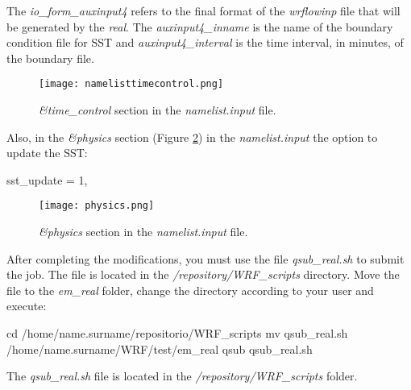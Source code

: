  The \textit{io\_form\_auxinput4} refers to the final format of the \textit{wrflowinp} file that will be generated by 
the \textit{real}. The \textit{auxinput4\_inname} is the name of the boundary condition file for SST and \textit{auxinput4\_interval} 
is the time interval, in minutes, of the boundary file.
\bigskip

\begin{figure}[H]
    \centering
    \texttt{[image: namelisttimecontrol.png]}
    \caption{\textit{\&time\_control} section in the \textit{namelist.input} file.}
    \label{timecontrolnamelist}
\end{figure}
\bigskip

 Also, in the \textit{\&physics} section (Figure \textcolor{bleu_cite}{\ref{physicsnamelist}}) in the \textit{namelist.input} 
the option to update the SST:
\bigskip

\begin{bashcode}
sst_update = 1,
\end{bashcode}
\bigskip

\begin{figure}[H]
    \centering
    \texttt{[image: physics.png]}
    \caption{\textit{\&physics} section in the \textit{namelist.input} file.}
    \label{physicsnamelist}
\end{figure}
\bigskip

 After completing the modifications, you must use the file \textit{qsub\_real.sh} to submit the job.
The file is located in the \textit{/repository/WRF\_scripts} directory. Move the file to the \textit{em\_real} folder, change the directory 
according to your user and execute:
\bigskip

\begin{bashcode}
cd /home/name.surname/repositorio/WRF_scripts
mv qsub_real.sh /home/name.surname/WRF/test/em_real
qsub qsub_real.sh
\end{bashcode}
\bigskip

\begin{tcolorbox}[enhanced,
  grow to left by=0cm,%
  grow to right by=0cm,%
  enlarge top by=0cm,%
  enlarge bottom by=0cm,%
  tcbox raise base,
  boxrule=1.0pt,
  left=18mm,
  colframe=yellow!50!black,coltext=yellow!25!black,colback=yellow!10!white,
  overlay={\begin{tcbclipinterior}\fill[yellow!75!blue!50!white] (frame.south west)
    rectangle node[text=white,font=\sffamily\bfseries\footnotesize,rotate=0] {ATTENTION} ([xshift=18mm]frame.north west);\end{tcbclipinterior}}]
The \textit{qsub\_real.sh} file is located in the \textit{/repository/WRF\_scripts} folder.
\end{tcolorbox}
\bigskip

